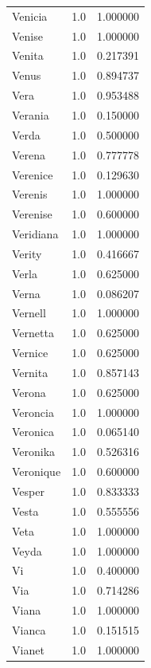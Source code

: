 \documentclass[
  letterpaper,
  DIV=11,
  numbers=noendperiod]{scrreprt}
\begin{document}
\begin{tabular}{lrr}
Venicia         &   1.0 &   1.000000 \\
Venise          &   1.0 &   1.000000 \\
Venita          &   1.0 &   0.217391 \\
Venus           &   1.0 &   0.894737 \\
Vera            &   1.0 &   0.953488 \\
Verania         &   1.0 &   0.150000 \\
Verda           &   1.0 &   0.500000 \\
Verena          &   1.0 &   0.777778 \\
Verenice        &   1.0 &   0.129630 \\
Verenis         &   1.0 &   1.000000 \\
Verenise        &   1.0 &   0.600000 \\
Veridiana       &   1.0 &   1.000000 \\
Verity          &   1.0 &   0.416667 \\
Verla           &   1.0 &   0.625000 \\
Verna           &   1.0 &   0.086207 \\
Vernell         &   1.0 &   1.000000 \\
Vernetta        &   1.0 &   0.625000 \\
Vernice         &   1.0 &   0.625000 \\
Vernita         &   1.0 &   0.857143 \\
Verona          &   1.0 &   0.625000 \\
Veroncia        &   1.0 &   1.000000 \\
Veronica        &   1.0 &   0.065140 \\
Veronika        &   1.0 &   0.526316 \\
Veronique       &   1.0 &   0.600000 \\
Vesper          &   1.0 &   0.833333 \\
Vesta           &   1.0 &   0.555556 \\
Veta            &   1.0 &   1.000000 \\
Veyda           &   1.0 &   1.000000 \\
Vi              &   1.0 &   0.400000 \\
Via             &   1.0 &   0.714286 \\
Viana           &   1.0 &   1.000000 \\
Vianca          &   1.0 &   0.151515 \\
Vianet          &   1.0 &   1.000000 \\

\end{tabular}
\end{document}
